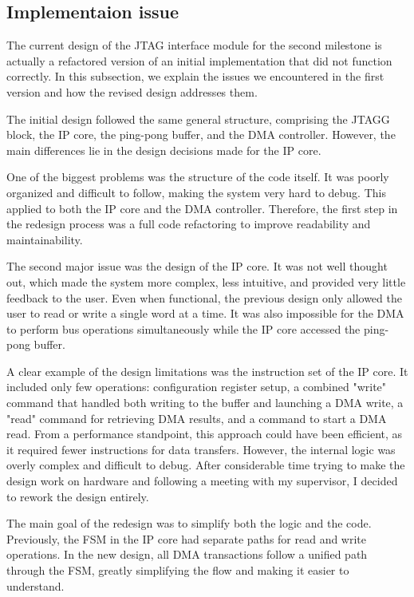 \documentclass[a4paper,11pt,oneside]{report}
\begin{document}
\subsection{Implementaion issue}

The current design of the JTAG interface module for the second milestone is actually a refactored version of an initial implementation that did not function correctly.  
In this subsection, we explain the issues we encountered in the first version and how the revised design addresses them.

The initial design followed the same general structure, comprising the JTAGG block, the IP core, the ping-pong buffer, and the DMA controller.  
However, the main differences lie in the design decisions made for the IP core.

One of the biggest problems was the structure of the code itself. It was poorly organized and difficult to follow, making the system very hard to debug.  
This applied to both the IP core and the DMA controller.  
Therefore, the first step in the redesign process was a full code refactoring to improve readability and maintainability.

The second major issue was the design of the IP core.  
It was not well thought out, which made the system more complex, less intuitive, and provided very little feedback to the user.  
Even when functional, the previous design only allowed the user to read or write a single word at a time.  
It was also impossible for the DMA to perform bus operations simultaneously while the IP core accessed the ping-pong buffer.

A clear example of the design limitations was the instruction set of the IP core.  
It included only few operations: configuration register setup, a combined "write" command that handled both writing to the buffer and launching a DMA write,  
a "read" command for retrieving DMA results, and a command to start a DMA read.  
From a performance standpoint, this approach could have been efficient, as it required fewer instructions for data transfers.  
However, the internal logic was overly complex and difficult to debug.  
After considerable time trying to make the design work on hardware and following a meeting with my supervisor, I decided to rework the design entirely.

The main goal of the redesign was to simplify both the logic and the code.  
Previously, the FSM in the IP core had separate paths for read and write operations.  
In the new design, all DMA transactions follow a unified path through the FSM, greatly simplifying the flow and making it easier to understand.
\end{document}
